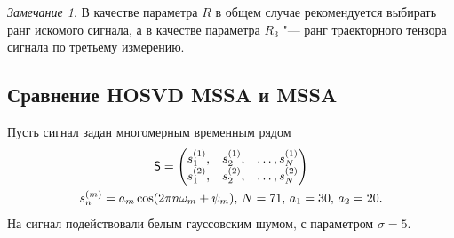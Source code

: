 \documentclass[11pt]{article}
\theoremstyle{plain}
\theoremstyle{definition}
\theoremstyle{remark}
\newtheorem*{remark}{Замечание}
\begin{document}
    \begin{remark}
        В качестве параметра $R$ в общем случае рекомендуется выбирать ранг искомого сигнала, а в качестве
        параметра $R_3$ "--- ранг траекторного тензора сигнала по третьему измерению.
    \end{remark}

    \subsection{Сравнение HOSVD MSSA и MSSA}\label{subsec:mssa-comparison}
    Пусть сигнал задан многомерным временным рядом
    \begin{gather*}
        \mathsf{S} =
        \begin{pmatrix}
            s_1^{(1)}, & s_2^{(1)}, & \ldots, s_N^{(1)} \\
            s_1^{(2)}, & s_2^{(2)}, & \ldots, s_N^{(2)}
        \end{pmatrix}\\
        s_n^{(m)} = a_m \cos(2\pi n \omega_m + \psi_m),\, N = 71,\, a_1 = 30,\, a_2 = 20.
    \end{gather*}
    На сигнал подействовали белым гауссовским шумом, с параметром ${\sigma=5}$.
\end{document}
